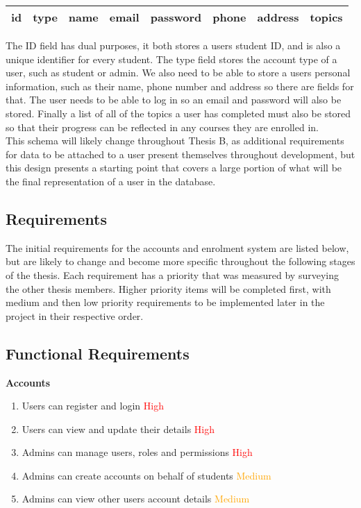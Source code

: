 \begin{center}
    \begin{tabular}{|c|c|c|c|c|c|c|c|} 
        \hline
        id & type & name & email & password & phone & address & topics \\ [0.5ex] 
        \hline
    \end{tabular}
\end{center}

The ID field has dual purposes, it both stores a users student ID, and is also a unique identifier for every student. The type field stores the account type of a user, such as student or admin. We also need to be able to store a users personal information, such as their name, phone number and address so there are fields for that. The user needs to be able to log in so an email and password will also be stored. Finally a list of all of the topics a user has completed must also be stored so that their progress can be reflected in any courses they are enrolled in.\\

This schema will likely change throughout Thesis B, as additional requirements for data to be attached to a user present themselves throughout development, but this design presents a starting point that covers a large portion of what will be the final representation of a user in the database.

\subsection{Requirements}
The initial requirements for the accounts and enrolment system are listed below, but are likely to change and become more specific throughout the following stages of the thesis. Each requirement has a priority that was measured by surveying the other thesis members. Higher priority items will be completed first, with medium and then low priority requirements to be implemented later in the project in their respective order.

\subsection{Functional Requirements}
\textbf{Accounts}
    \begin{enumerate}
    \item Users can register and login \textcolor{Red}{High}
    \item Users can view and update their details \textcolor{Red}{High}
    \item Admins can manage users, roles and permissions \textcolor{Red}{High}
    \item Admins can create accounts on behalf of students \textcolor{Orange}{Medium}
    \item Admins can view other users account details \textcolor{Orange}{Medium}
    \end{enumerate}

